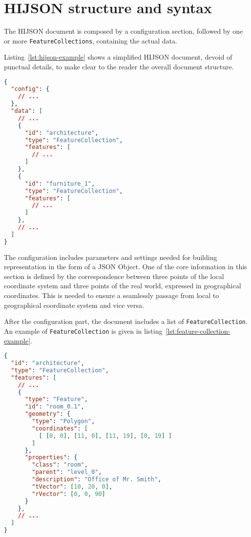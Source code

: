 
\section{HIJSON structure and syntax}\label{hijson-syntax}

The HIJSON document is composed by a configuration section, followed by one or more {\tt FeatureCollections}, containing the actual data.

Listing~\ref{lst:hijson-example} shows a simplified HIJSON document, devoid of punctual details, to make clear to the reader the overall document structure.


\begin{lstlisting}[language=json, label={lst:hijson-example}, captionpos=b, caption=Example of HIJSON document.]
{
  "config": {
    // ...
  },
  "data": [
    // ...
    {
      "id": "architecture",
      "type": "FeatureCollection",
      "features": [
        // ...
      ] 
    },
    {
      "id": "furniture_1",
      "type": "FeatureCollection",
      "features": [
        // ...
      ] 
    },
    // ...
  ]
}
\end{lstlisting}


The configuration includes parameters and settings needed for building representation in the form of a JSON Object. One of the core information in this section is defined by the correspondence between three points of the local coordinate system and three points of the real world, expressed in geographical coordinates. This is needed to ensure a seamlessly passage from local to geographical coordinate system and vice versa.

After the configuration part, the document includes a list of {\tt FeatureCollection}. An example
of {\tt FeatureCollection} is given in listing~\ref{lst:feature-collection-example}.


\begin{lstlisting}[language=json, label={lst:feature-collection-example}, captionpos=b,  caption=Example of {\tt FeatureCollection}.]
{
  "id": "architecture",
  "type": "FeatureCollection",
  "features": [
    // ...
    {
      "type": "Feature",
      "id": "room_0.1",
      "geometry": {
        "type": "Polygon",
        "coordinates": [
          [ [0, 0], [11, 0], [11, 19], [0, 19] ]
        ]
      },
      "properties": {
        "class": "room",
        "parent": "level_0",
        "description": "Office of Mr. Smith",
        "tVector": [10, 20, 0],
        "rVector": [0, 0, 90]
      }
    },
    // ...
  ]
}
\end{lstlisting}

